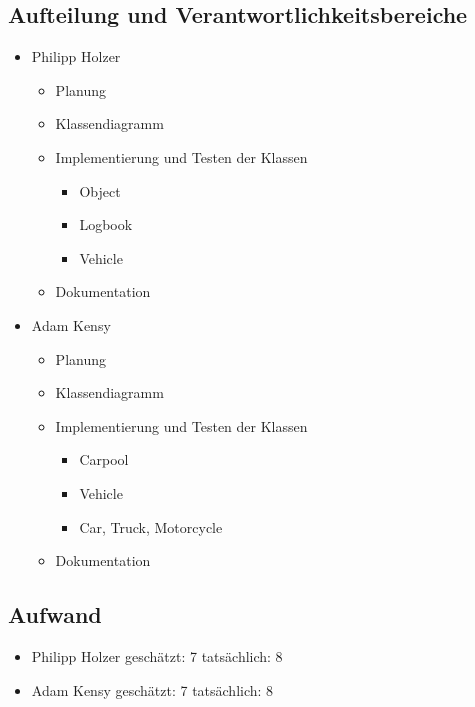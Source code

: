 \subsection{Aufteilung und Verantwortlichkeitsbereiche}
\begin{itemize}
	\item Philipp Holzer
		\begin{itemize}
		\item Planung
		\item Klassendiagramm
		\item Implementierung und Testen der Klassen
			\begin{itemize}
			\item Object
			\item Logbook
			\item Vehicle
			\end{itemize}
		\item Dokumentation
		\end{itemize}
	\item Adam Kensy
		\begin{itemize}
		\item Planung
		\item Klassendiagramm
		\item Implementierung und Testen der Klassen
			\begin{itemize}
			\item Carpool
			\item Vehicle
			\item Car, Truck, Motorcycle
			\end{itemize}
		\item Dokumentation
		\end{itemize}
\end{itemize}

\subsection{Aufwand}
\begin{itemize}
	\item Philipp Holzer		\tab geschätzt: 7	\tab tatsächlich: 8
	\item Adam Kensy		\tab  geschätzt:	7	\tab  tatsächlich: 8
\end{itemize}



